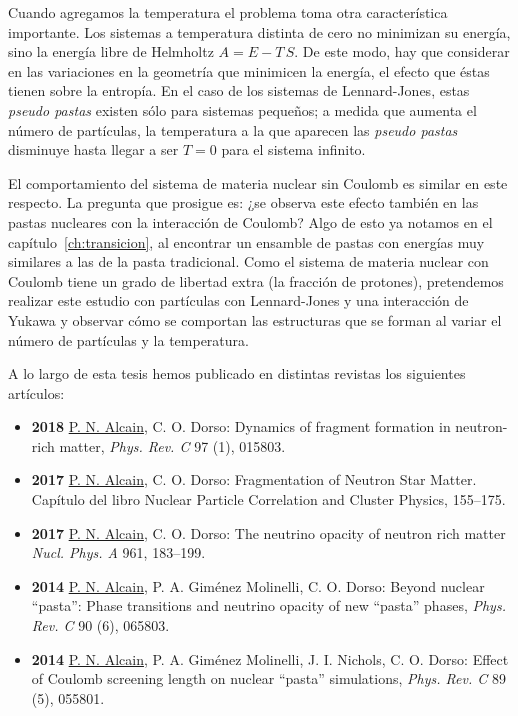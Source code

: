 Cuando agregamos la temperatura el problema toma otra característica importante.
Los sistemas a temperatura distinta de cero no minimizan su energía, sino la energía libre de Helmholtz $A = E - T\,S$.
De este modo, hay que considerar en las variaciones en la geometría que minimicen la energía, el efecto que éstas tienen sobre la entropía.
En el caso de los sistemas de Lennard-Jones, estas \emph{pseudo pastas} existen sólo para sistemas pequeños; a medida que aumenta el número de partículas, la temperatura a la que aparecen las \emph{pseudo pastas} disminuye hasta llegar a ser $T=0$ para el sistema infinito.

El comportamiento del sistema de materia nuclear sin Coulomb es similar en este respecto.
La pregunta que prosigue es: ¿se observa este efecto también en las pastas nucleares con la interacción de Coulomb?
Algo de esto ya notamos en el capítulo~\ref{ch:transicion}, al encontrar un ensamble de pastas con energías muy similares a las de la pasta tradicional.
Como el sistema de materia nuclear con Coulomb tiene un grado de libertad extra (la fracción de protones), pretendemos realizar este estudio con partículas con Lennard-Jones y una interacción de Yukawa y observar cómo se comportan las estructuras que se forman al variar el número de partículas y la temperatura.


A lo largo de esta tesis hemos publicado en distintas revistas los siguientes artículos:

\begin{itemize}
\item \textbf{2018} \underline{P. N. Alcain}, C. O. Dorso: Dynamics of fragment formation in neutron-rich matter, \emph{Phys. Rev. C} 97 (1), 015803.

\item \textbf{2017} \underline{P. N. Alcain}, C. O. Dorso: Fragmentation of Neutron Star Matter. Capítulo del libro Nuclear Particle Correlation and Cluster Physics, 155--175.

\item \textbf{2017} \underline{P. N. Alcain}, C. O. Dorso: The neutrino opacity of neutron rich matter \emph{Nucl. Phys. A} 961, 183--199.

\item \textbf{2014} \underline{P. N. Alcain}, P. A. Giménez Molinelli, C. O. Dorso: Beyond nuclear ``pasta'': Phase transitions and neutrino opacity of new ``pasta'' phases, \emph{Phys. Rev. C} 90 (6), 065803.

\item \textbf{2014} \underline{P. N. Alcain}, P. A. Giménez Molinelli, J. I. Nichols, C. O. Dorso: Effect of Coulomb screening length on nuclear ``pasta'' simulations, \emph{Phys. Rev. C} 89 (5), 055801.

\end{itemize}